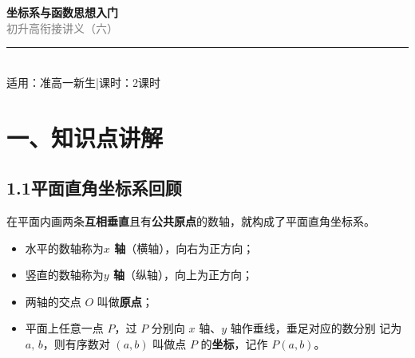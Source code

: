 \documentclass[12pt, a4paper]{ctexart}
\begin{document}
\begin{center}
{\Huge\bfseries\textcolor{mainblue}{坐标系与函数思想入门}}\\[12pt]
{\Large\textcolor{gray}{初升高衔接讲义（六）}}\\[8pt]
\rule{0.6\textwidth}{1pt}\\[8pt]
{\normalsize 适用：准高一新生\quad |\quad 课时：2课时}
\end{center}
\vspace{10pt}

\section*{\textcolor{mainblue}{一、知识点讲解}}

\subsection*{1.1\quad 平面直角坐标系回顾}

\begin{knowledgebox}[平面直角坐标系]
在平面内画两条\textbf{互相垂直}且有\textbf{公共原点}的数轴，就构成了平面直角坐标系。
\begin{itemize}[leftmargin=2em]
  \item 水平的数轴称为\textbf{$x$ 轴}（横轴），向右为正方向；
  \item 竖直的数轴称为\textbf{$y$ 轴}（纵轴），向上为正方向；
  \item 两轴的交点 $O$ 叫做\textbf{原点}；
  \item 平面上任意一点 $P$，过 $P$ 分别向 $x$ 轴、$y$ 轴作垂线，垂足对应的数分别
        记为 $a,\,b$，则有序数对 $(a,b)$ 叫做点 $P$ 的\textbf{坐标}，记作 $P(a,b)$。
\end{itemize}
\end{knowledgebox}
\end{document}
